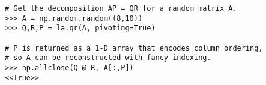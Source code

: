 \begin{lstlisting}
# Get the decomposition AP = QR for a random matrix A.
>>> A = np.random.random((8,10))
>>> Q,R,P = la.qr(A, pivoting=True)

# P is returned as a 1-D array that encodes column ordering,
# so A can be reconstructed with fancy indexing.
>>> np.allclose(Q @ R, A[:,P])
<<True>>
\end{lstlisting}

\begin{comment}
\subsection*{Stability of the QR Decomposition in SciPy} %

SciPy's QR factorization routine uses Householder reflections.
Though this routine is numerically stable, there are still potential numerical problems.
Consider the following example.

\begin{lstlisting}
# Generate a random orthonormal matrix and a random upper-triangular matrix.
>>> Q, _ = la.qr(np.random.normal(size=(500,500)))
>>> R  = np.triu(np.random.normal(size=(500,500)))

# Calculate A = QR, noting that Q and R are the EXACT QR decomposition of A.
>>> A = Q @ R

# Use SciPy to rediscover the QR decomposition of A.
>>> Q1, R1 = la.qr(A)

# Compare the true Q and R to the computed Q1 and R1.
>>> print(la.norm(Q1-Q, <<ord>>=np.inf) / la.norm(Q, <<ord>>=np.inf))
1.21169651649

>>> print(la.norm(R1-R, <<ord>>=np.inf) / la.norm(R, <<ord>>=np.inf))
1.72312747194
\end{lstlisting}

This is terrible!
This algorithm works in $16$ decimal points of precision, but $Q_1$ and $R_1$ are accurate to $0$ decimal points.
These errors in $Q_1$ and $R_1$ are called \emph{forward errors}.
Even so, miraculously, the product $Q_1 R_1$ is very close $A$.

\begin{lstlisting}
>>> A1 = Q1 @ R1
>>> la.norm(A1 - A, <<ord>>=np.inf) / la.norm(A, <<ord>>=np.inf)
3.353843164496928e-15
\end{lstlisting}

The error in $A_1$, called the \emph{backward error}, is very small.
This shows that the errors in $Q_1$ and $R_1$ are somehow ``correlated,'' so that they cancel out in the product.
In fact, the large errors in $Q_1$ and $R_1$ are not because the algorithm is bad, but rather because $A$ was \emph{poorly conditioned} to begin with.
Conditioning and stability will be discussed more in depth later in the curriculum.
\end{comment}

